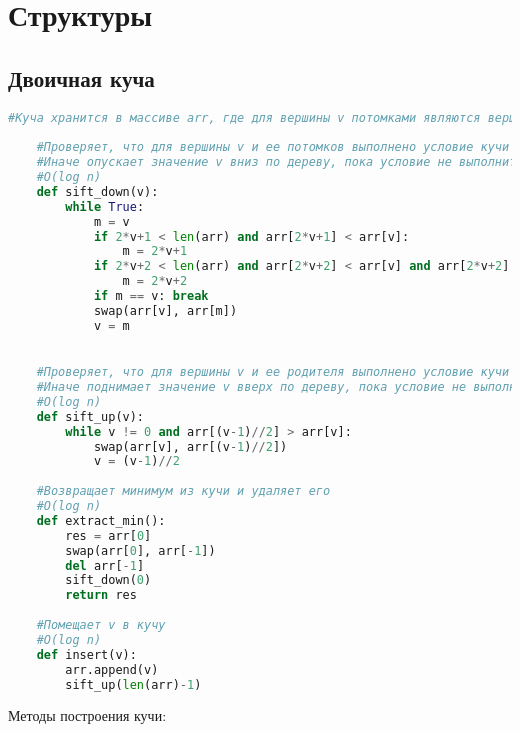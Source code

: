 \documentclass[12pt]{article}
\begin{document}
\section{Структуры}
\subsection{Двоичная куча}
\begin{lstlisting}[language=Python]
    #Куча хранится в массиве arr, где для вершины v потомками являются вершины 2*v+1 и 2*v+2
    
    #Проверяет, что для вершины v и ее потомков выполнено условие кучи 
    #Иначе опускает значение v вниз по дереву, пока условие не выполнится
    #O(log n)
    def sift_down(v):
        while True:
            m = v
            if 2*v+1 < len(arr) and arr[2*v+1] < arr[v]:
                m = 2*v+1
            if 2*v+2 < len(arr) and arr[2*v+2] < arr[v] and arr[2*v+2] < arr[2*v+1]:
                m = 2*v+2
            if m == v: break
            swap(arr[v], arr[m])
            v = m
    

    #Проверяет, что для вершины v и ее родителя выполнено условие кучи 
    #Иначе поднимает значение v вверх по дереву, пока условие не выполнится
    #O(log n)
    def sift_up(v):
        while v != 0 and arr[(v-1)//2] > arr[v]:
            swap(arr[v], arr[(v-1)//2])
            v = (v-1)//2
    
    #Возвращает минимум из кучи и удаляет его
    #O(log n)
    def extract_min():
        res = arr[0]
        swap(arr[0], arr[-1])
        del arr[-1]
        sift_down(0)
        return res
        
    #Помещает v в кучу
    #O(log n)
    def insert(v):
        arr.append(v)
        sift_up(len(arr)-1)
\end{lstlisting}
Методы построения кучи:
\end{document}
